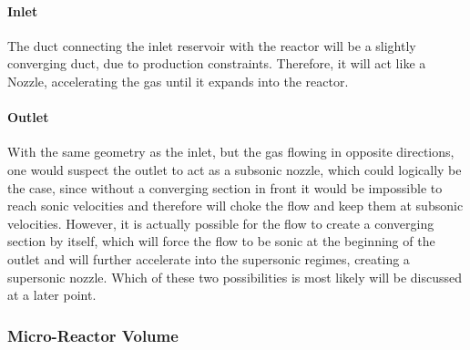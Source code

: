 	\paragraph{Inlet}
		The duct connecting the inlet reservoir with the reactor will be a slightly converging duct, due to production constraints.
		Therefore, it will act like a Nozzle, accelerating the gas until it expands into the reactor.
	
	\paragraph{Outlet}
		With the same geometry as the inlet, but the gas flowing in opposite directions, one would suspect the outlet to act as a subsonic nozzle, which could logically be the case, since without a converging section in front it would be impossible to reach sonic velocities and therefore will choke the flow and keep them at subsonic velocities.
		However, it is actually possible for the flow to create a converging section by itself, which will force the flow to be sonic at the beginning of the outlet and will further accelerate into the supersonic regimes, creating a supersonic nozzle.
		Which of these two possibilities is most likely will be discussed at a later point.
\subsubsection*{Micro-Reactor Volume}

